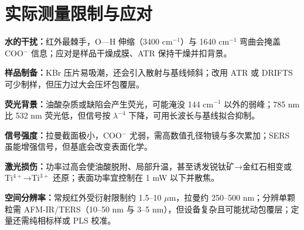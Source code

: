 \section{实际测量限制与应对}

\noindent\textbf{水的干扰：}红外最棘手，O—H 伸缩（3400 cm$^{-1}$）与 1640 cm$^{-1}$ 弯曲会掩盖 COO$^-$ 信息；应对是样品干燥成膜、ATR 保持干燥并扣背景\cite{piao2026ir}。

\noindent\textbf{样品制备：}KBr 压片易吸潮，还会引入散射与基线倾斜；改用 ATR 或 DRIFTS 可少制样，但压力过大会压坏包覆层。

\noindent\textbf{荧光背景：}油酸杂质或缺陷会产生荧光，可能淹没 144 cm$^{-1}$ 以外的弱峰；785 nm 比 532 nm 荧光低，但信号按 $\lambda^{-4}$ 下降，可用长波长与基线拟合抑制。

\noindent\textbf{信号强度：}拉曼截面极小，COO$^-$ 尤弱，需高数值孔径物镜与多次累加；SERS 虽能增强信号，但基底会改变表面化学\cite{wang2021}。

\noindent\textbf{激光损伤：}功率过高会使油酸脱附、局部升温，甚至诱发锐钛矿→金红石相变或 Ti$^{4+}$→Ti$^{3+}$ 还原\cite{taudul2023}；表面功率宜控制在 1 mW 以下并散焦。

\noindent\textbf{空间分辨率：}常规红外受衍射限制约 1.5--10 $\mu$m，拉曼约 250--500 nm；分辨单颗粒需 AFM-IR/TERS（10--50 nm 与 3--5 nm），但设备复杂且可能扰动包覆层\cite{kurouski2020}；定量还需纯相标样或 PLS 校准\cite{sacco2023}。
